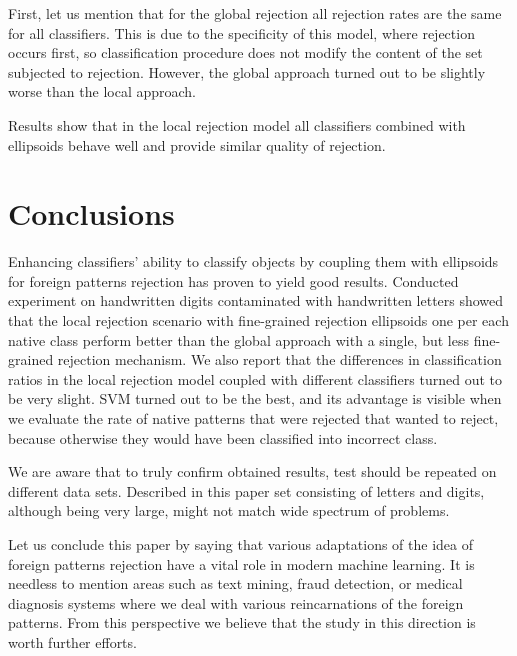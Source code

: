 \documentclass{llncs}
\begin{document}
First, let us mention that for the global rejection all rejection rates are the same for all classifiers. This is due to the specificity of this model, where rejection occurs first, so classification procedure does not modify the content of the set subjected to rejection. However, the global approach turned out to be slightly worse than the local approach. 

Results show that in the local rejection model all classifiers combined with ellipsoids behave well and provide similar quality of rejection.   

\vspace{-6pt}
\section{Conclusions}
  \label{sec:Conclusion}
\vspace{-3pt}

Enhancing classifiers' ability to classify objects by coupling them with ellipsoids for foreign patterns rejection has proven to yield good results. Conducted experiment on handwritten digits contaminated with handwritten letters showed that  the local rejection scenario with fine-grained rejection ellipsoids one per each native class perform better than the global approach with a single, but less fine-grained rejection mechanism. We also report that the differences in classification ratios in the local rejection model coupled with different classifiers turned out to be very slight. SVM turned out to be the best, and its advantage is visible when we evaluate the rate of native patterns that were rejected that wanted to reject, because otherwise they would have been classified into incorrect class.

We are aware that to truly confirm obtained results, test should be repeated on different data sets. Described in this paper set consisting of letters and digits, although being very large, might not match wide spectrum of problems.  %

Let us conclude this paper by saying that various adaptations of the idea of foreign patterns rejection have a vital role in modern machine learning. It is needless to mention areas such as text mining, fraud detection, or medical diagnosis systems where we deal with various reincarnations of the foreign patterns. From this perspective we believe that the study in this direction is worth further efforts.
\end{document}
